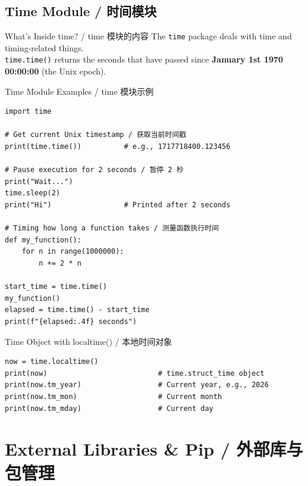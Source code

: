 \documentclass[11pt,a4paper]{report}
\let\oldtexttt\texttt
\renewcommand{\texttt}[1]{\textcolor{mainblue}{\oldtexttt{#1}}}
\begin{document}
\subsection{Time Module / 时间模块}

\begin{concept}{What's Inside time? / time 模块的内容}
    The \texttt{time} package deals with time and timing-related things. \\
    \texttt{time.time()} returns the seconds that have passed since \textbf{January 1st 1970 00:00:00} (the Unix epoch).
\end{concept}

\begin{examplebox}{Time Module Examples / time 模块示例}
\begin{lstlisting}
import time

# Get current Unix timestamp / 获取当前时间戳
print(time.time())          # e.g., 1717718400.123456

# Pause execution for 2 seconds / 暂停 2 秒
print("Wait...")
time.sleep(2)
print("Hi")                 # Printed after 2 seconds

# Timing how long a function takes / 测量函数执行时间
def my_function():
    for n in range(1000000):
        n += 2 * n

start_time = time.time()
my_function()
elapsed = time.time() - start_time
print(f"{elapsed:.4f} seconds")
\end{lstlisting}
\end{examplebox}

\begin{examplebox}{Time Object with localtime() / 本地时间对象}
\begin{lstlisting}
now = time.localtime()
print(now)                          # time.struct_time object
print(now.tm_year)                  # Current year, e.g., 2026
print(now.tm_mon)                   # Current month
print(now.tm_mday)                  # Current day
\end{lstlisting}
\end{examplebox}

\section{External Libraries \& Pip / 外部库与包管理}
\end{document}
